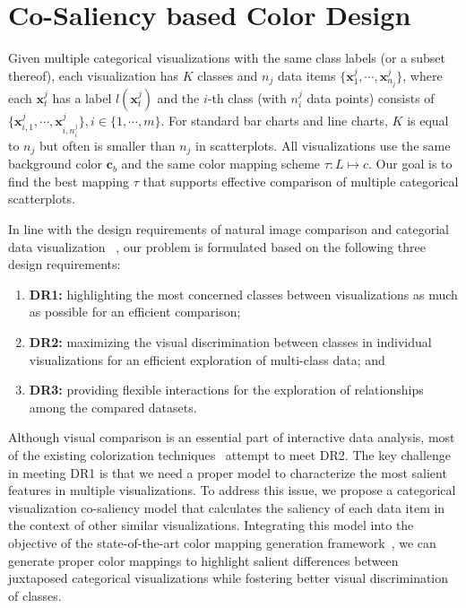 \section{Co-Saliency based Color Design}
Given multiple categorical visualizations with the same class labels (or a subset thereof), each visualization has $K$ classes and $n_j$ data items $\{\mathbf{x}^j_1, \cdots, \mathbf{x}^j_{n_j}\}$, where each $\mathbf{x}^j_t$ has a label
$l(\mathbf{x}^j_t)$ and the $i$-th class (with $n^j_i$ data points) consists of $\{\mathbf{x}_{i,1}^j, \cdots , \mathbf{x}_{i,n^j_i}^j\}, i \in  \{ 1, \cdots, m \} $.
For standard bar charts and line charts, $K$ is equal to $n_j$ but often is smaller than $n_j$ in scatterplots.
All visualizations use the same  background color $\mathbf{c}_b$ and the same color mapping scheme $\tau: L \mapsto c$. Our goal is to find the best mapping $\tau$ that supports effective comparison of multiple categorical scatterplots.

In line with the design requirements of natural image comparison and categorial data visualization ~\cite{Jacobs10,Gleicher18,Lu21},
our problem is formulated based on the following three design requirements:
\begin{enumerate}[label=(\roman*),nosep]
\item \textbf{DR1:} highlighting the most concerned classes between visualizations as much as possible for an efficient comparison;
\item \textbf{DR2:} maximizing the visual discrimination between classes in individual visualizations for an efficient exploration of multi-class data; and
\item \textbf{DR3:} providing flexible interactions for the exploration of relationships among the compared datasets.
\end{enumerate}
Although visual comparison is an essential part of interactive data analysis, most of  the existing  colorization techniques~\cite{Gramazio17, Lu21} attempt to meet DR2. The key challenge in meeting DR1 is that we need a proper model to characterize the most salient features in multiple visualizations.
To address this issue, we propose a categorical visualization co-saliency model that calculates the saliency of each data item in the context of other similar visualizations. Integrating this model into the objective of the state-of-the-art color mapping generation framework~\cite{Lu21}, we can
generate proper color mappings to highlight salient differences between juxtaposed categorical visualizations while fostering better visual discrimination of classes.



